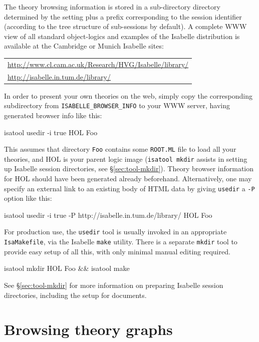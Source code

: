 \bigskip The theory browsing information is stored in a sub-directory
directory determined by the  setting plus a
prefix corresponding to the session identifier (according to the tree
structure of sub-sessions by default).  A complete WWW view of all standard
object-logics and examples of the Isabelle distribution is available at the
Cambridge or Munich Isabelle sites:
\begin{center}\small
  \begin{tabular}{l}
    \url{http://www.cl.cam.ac.uk/Research/HVG/Isabelle/library/} \\
    \url{http://isabelle.in.tum.de/library/} \\
  \end{tabular}
\end{center}

\medskip In order to present your own theories on the web, simply copy the
corresponding subdirectory from \texttt{ISABELLE_BROWSER_INFO} to your WWW
server, having generated browser info like this:
\begin{ttbox}
isatool usedir -i true HOL Foo
\end{ttbox}
This assumes that directory \texttt{Foo} contains some \texttt{ROOT.ML} file
to load all your theories, and HOL is your parent logic image (\texttt{isatool
  mkdir} assists in setting up Isabelle session directories, see
\S\ref{sec:tool-mkdir}).  Theory browser information for HOL should have been
generated already beforehand.  Alternatively, one may specify an external link
to an existing body of HTML data by giving \texttt{usedir} a \texttt{-P}
option like this:
\begin{ttbox}
isatool usedir -i true -P http://isabelle.in.tum.de/library/ HOL Foo
\end{ttbox}

\medskip For production use, the \texttt{usedir} tool is usually invoked in an
appropriate \texttt{IsaMakefile}, via the Isabelle \texttt{make} utility.
There is a separate \texttt{mkdir} tool to provide easy setup of all this,
with only minimal manual editing required.
\begin{ttbox}
isatool mkdir HOL Foo && isatool make
\end{ttbox}
See \S\ref{sec:tool-mkdir} for more information on preparing Isabelle session
directories, including the setup for documents.


\section{Browsing theory graphs} \label{sec:browse}

